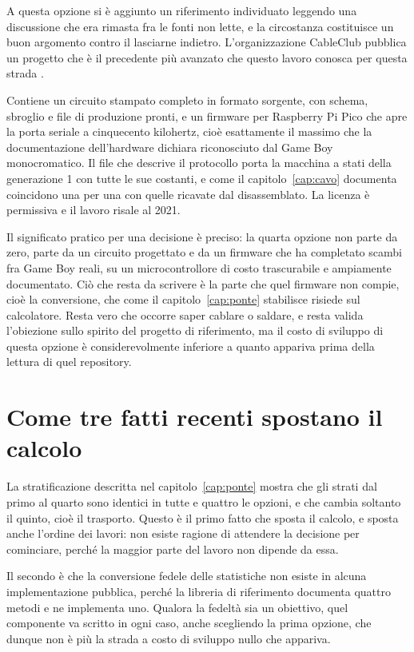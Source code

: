 A questa opzione si è aggiunto un riferimento individuato leggendo una discussione che era rimasta fra le fonti non lette, e la circostanza costituisce un buon argomento contro il lasciarne indietro. L'organizzazione CableClub pubblica un progetto che è il precedente più avanzato che questo lavoro conosca per questa strada \cite{cable-link}.

Contiene un circuito stampato completo in formato sorgente, con schema, sbroglio e file di produzione pronti, e un firmware per Raspberry Pi Pico che apre la porta seriale a cinquecento kilohertz, cioè esattamente il massimo che la documentazione dell'hardware dichiara riconosciuto dal Game Boy monocromatico. Il file che descrive il protocollo porta la macchina a stati della generazione 1 con tutte le sue costanti, e come il capitolo~\ref{cap:cavo} documenta coincidono una per una con quelle ricavate dal disassemblato. La licenza è permissiva e il lavoro risale al 2021.

Il significato pratico per una decisione è preciso: la quarta opzione non parte da zero, parte da un circuito progettato e da un firmware che ha completato scambi fra Game Boy reali, su un microcontrollore di costo trascurabile e ampiamente documentato. Ciò che resta da scrivere è la parte che quel firmware non compie, cioè la conversione, che come il capitolo~\ref{cap:ponte} stabilisce risiede sul calcolatore. Resta vero che occorre saper cablare o saldare, e resta valida l'obiezione sullo spirito del progetto di riferimento, ma il costo di sviluppo di questa opzione è considerevolmente inferiore a quanto appariva prima della lettura di quel repository.

\section{Come tre fatti recenti spostano il calcolo}

La stratificazione descritta nel capitolo~\ref{cap:ponte} mostra che gli strati dal primo al quarto sono identici in tutte e quattro le opzioni, e che cambia soltanto il quinto, cioè il trasporto. Questo è il primo fatto che sposta il calcolo, e sposta anche l'ordine dei lavori: non esiste ragione di attendere la decisione per cominciare, perché la maggior parte del lavoro non dipende da essa.

Il secondo è che la conversione fedele delle statistiche non esiste in alcuna implementazione pubblica, perché la libreria di riferimento documenta quattro metodi e ne implementa uno. Qualora la fedeltà sia un obiettivo, quel componente va scritto in ogni caso, anche scegliendo la prima opzione, che dunque non è più la strada a costo di sviluppo nullo che appariva.

